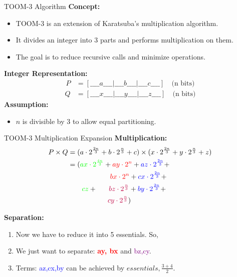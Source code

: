 \documentclass{beamer}
\begin{document}
\begin{frame}{TOOM-3 Algorithm}
    \textbf{Concept:} 
    \begin{itemize}
        \item TOOM-3 is an extension of Karatsuba's multiplication algorithm.
        \item It divides an integer into 3 parts and performs multiplication on them.
        \item The goal is to reduce recursive calls and minimize operations.
    \end{itemize}
    \textbf{Integer Representation:}
    \begin{align*}
        P &= [\_\_\_\_a\_\_\_\_|\_\_\_\_b\_\_\_\_|\_\_\_\_c\_\_\_\_] \quad \text{(n bits)}
    \end{align*}
    \begin{align*}
        Q &= [\_\_\_\_x\_\_\_\_|\_\_\_\_y\_\_\_\_|\_\_\_\_z\_\_\_\_] \quad \text{(n bits)}
    \end{align*}
    \textbf{Assumption:} 
    \begin{itemize}
        \item $n$ is divisible by 3 to allow equal partitioning.
    \end{itemize}
\end{frame}

\begin{frame}{TOOM-3 Multiplication Expansion}
    \textbf{Multiplication:}
    \begin{align*}
        P \times Q &= (a \cdot 2^{\frac{2n}{3}} + b \cdot 2^{\frac{n}{3}} + c) \times (x \cdot 2^{\frac{2n}{3}} + y \cdot 2^{\frac{n}{3}} + z) \\
                   &= (\textcolor{green}{ax\cdot 2^{\frac{4n}{3}}} + \textcolor{red}{ay \cdot 2^n} + \textcolor{blue}{az \cdot 2^{\frac{2n}{3}}} + \\
                   & \quad \ \ \ \ \ \ \ \ \ \ \ \ \ \ \ \textcolor{red}{bx \cdot 2^n} + \textcolor{blue}{cx \cdot 2^{\frac{2n}{3}}} + \\
                   & \ \ \ \quad \textcolor{green}{cz} + \ \ \ \ \ \textcolor{purple}{bz \cdot 2^{\frac{n}{3}}} + \textcolor{blue}{by \cdot 2^{\frac{2n}{3}}} + \\
                   & \quad \ \ \ \ \ \ \ \ \ \ \ \ \ \ \textcolor{purple}{cy \cdot 2^{\frac{n}{3}}})
    \end{align*}
    
    \textbf{Separation:}
    \begin{enumerate}
        \item Now we have to reduce it into 5 essentials. So,
        \item We just want to separate: \textcolor{red}{\textbf{ay, bx}} and \textcolor{purple}{bz,cy}.
        \item Terms: \textcolor{blue}{az,cx,by} can be achieved by $essentials, \frac{3+4}{2}$.
    \end{enumerate}
\end{frame}
\end{document}
